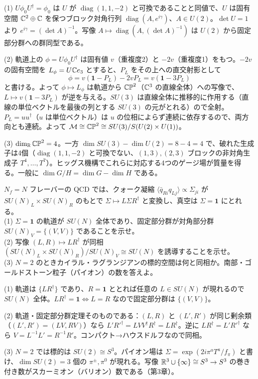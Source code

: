 \begin{solution}
(1) $U\phi_0U^\dagger=\phi_0$ は $U$ が $\operatorname{diag}(1,1,-2)$ と可換であることと同値で、$U$ は固有空間 $\mathbb{C}^2\oplus\mathbb{C}$ を保つブロック対角行列 $\operatorname{diag}(A,e^{i\gamma})$、$A\in U(2)$。$\det U=1$ より $e^{i\gamma}=(\det A)^{-1}$。写像 $A\mapsto\operatorname{diag}(A,(\det A)^{-1})$ は $U(2)$ から固定部分群への群同型である。

(2) 軌道上の $\phi=U\phi_0U^\dagger$ は固有値 $v$（重複度2）と $-2v$（重複度1）をもつ。$-2v$ の固有空間を $L_\phi=U\mathbb{C} e_3$ とすると、$P_L$ をその上への直交射影として
\[
\phi=v(\mathbf 1-P_L)-2vP_L=v(\mathbf 1-3P_L)
\]
と書ける。よって $\phi\mapsto L_\phi$ は軌道から $\mathbb{CP}^2$（$\mathbb{C}^3$ の直線全体）への写像で、$L\mapsto v(\mathbf 1-3P_L)$ が逆を与える。$SU(3)$ は直線全体に推移的に作用する（直線の単位ベクトルを最後の列とする $SU(3)$ の元がとれる）ので全射。$P_L=uu^\dagger$（$u$ は単位ベクトル）は $u$ の位相によらず連続に依存するので、両方向とも連続。よって $\mathcal M\cong\mathbb{CP}^2\cong SU(3)/S(U(2)\times U(1))$。

(3) $\dim_{\mathbb{R}}\mathbb{CP}^2=4$。一方 $\dim SU(3)-\dim U(2)=8-4=4$ で、破れた生成子は4個（$\operatorname{diag}(1,1,-2)$ と可換でない、$(1,3),(2,3)$ ブロックの非対角生成子 $T^4,\dots,T^7$）。ヒッグス機構でこれらに対応する4つのゲージ場が質量を得る。一般に $\dim G/H=\dim G-\dim H$ である。
\end{solution}

\begin{problem}[難易度 B]\label{ch01-prob-chiral}
$N_f=N$ フレーバーの QCD では、クォーク凝縮 $\langle\bar q_{Ri}q_{Lj}\rangle\propto\Sigma_{ji}$ が $SU(N)_L\times SU(N)_R$ のもとで $\Sigma\mapsto L\Sigma R^\dagger$ と変換し、真空は $\Sigma=\mathbf 1$ にとれる。\\
(1) $\Sigma=\mathbf 1$ の軌道が $SU(N)$ 全体であり、固定部分群が対角部分群 $SU(N)_V=\{(V,V)\}$ であることを示せ。\\
(2) 写像 $(L,R)\mapsto LR^\dagger$ が同相 $(SU(N)_L\times SU(N)_R)/SU(N)_V\cong SU(N)$ を誘導することを示せ。\\
(3) $N=2$ のときカイラル・ラグランジアンの標的空間は何と同相か。南部・ゴールドストーン粒子（パイオン）の数を答えよ。
\end{problem}

\begin{solution}
(1) 軌道は $\{L R^\dagger\}$ であり、$R=\mathbf 1$ ととれば任意の $L\in SU(N)$ が現れるので $SU(N)$ 全体。$L R^\dagger=\mathbf 1\iff L=R$ なので固定部分群は $\{(V,V)\}$。

(2) 軌道・固定部分群定理そのものである：$(L,R)$ と $(L',R')$ が同じ剰余類（$(L',R')=(LV,RV)$）なら $L'R'^\dagger=LVV^\dagger R^\dagger=LR^\dagger$。逆に $LR^\dagger=L'R'^\dagger$ なら $V=L^{-1}L'=R^{-1}R'$。コンパクト→ハウスドルフなので同相。

(3) $N=2$ では標的は $SU(2)\cong S^3$。パイオン場は $\Sigma=\exp(2i\pi^aT^a/f_\pi)$ と書け、$\dim SU(2)=3$ 個の $\pi^\pm,\pi^0$ が現れる。写像 $\mathbb{R}^3\cup\{\infty\}\cong S^3\to S^3$ の巻き付き数がスカーミオン（バリオン）数である（第3章）。
\end{solution}


